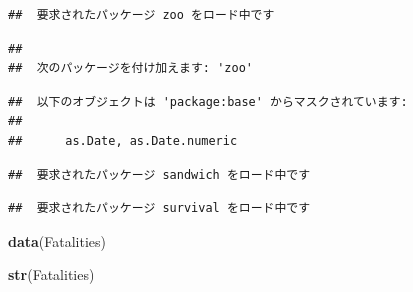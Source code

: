 \documentclass[]{book}
\newenvironment{Shaded}{\begin{snugshade}}{\end{snugshade}}
\newcommand{\KeywordTok}[1]{\textcolor[rgb]{0.13,0.29,0.53}{\textbf{#1}}}
\newcommand{\NormalTok}[1]{#1}
\begin{document}
\begin{verbatim}
##  要求されたパッケージ zoo をロード中です
\end{verbatim}

\begin{verbatim}
## 
##  次のパッケージを付け加えます: 'zoo'
\end{verbatim}

\begin{verbatim}
##  以下のオブジェクトは 'package:base' からマスクされています: 
## 
##      as.Date, as.Date.numeric
\end{verbatim}

\begin{verbatim}
##  要求されたパッケージ sandwich をロード中です
\end{verbatim}

\begin{verbatim}
##  要求されたパッケージ survival をロード中です
\end{verbatim}

\begin{Shaded}
\begin{Highlighting}[]
\KeywordTok{data}\NormalTok{(Fatalities)}

\KeywordTok{str}\NormalTok{(Fatalities)}
\end{Highlighting}
\end{Shaded}
\end{document}
